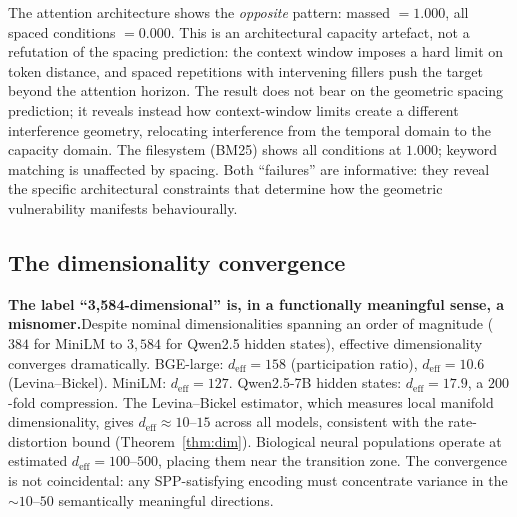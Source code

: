 \documentclass[11pt]{article}
\begin{document}
The attention architecture shows the \textit{opposite} pattern: massed $= 1.000$, all spaced conditions $= 0.000$. This is an architectural capacity artefact, not a refutation of the spacing prediction: the context window imposes a hard limit on token distance, and spaced repetitions with intervening fillers push the target beyond the attention horizon. The result does not bear on the geometric spacing prediction; it reveals instead how context-window limits create a different interference geometry, relocating interference from the temporal domain to the capacity domain. The filesystem (BM25) shows all conditions at $1.000$; keyword matching is unaffected by spacing. Both ``failures'' are informative: they reveal the specific architectural constraints that determine how the geometric vulnerability manifests behaviourally.

\subsection*{The dimensionality convergence}

\noindent\textbf{The label ``3{,}584-dimensional'' is, in a functionally meaningful sense, a misnomer.}\quad Despite nominal dimensionalities spanning an order of magnitude ($384$ for MiniLM to $3{,}584$ for Qwen2.5 hidden states), effective dimensionality converges dramatically. BGE-large: $d_\text{eff} = 158$ (participation ratio), $d_\text{eff} = 10.6$ (Levina--Bickel\cite{levina2005}). MiniLM: $d_\text{eff} = 127$. Qwen2.5-7B hidden states: $d_\text{eff} = 17.9$, a $200$-fold compression. The Levina--Bickel estimator, which measures local manifold dimensionality, gives $d_\text{eff} \approx 10$--$15$ across all models, consistent with the rate-distortion bound (Theorem~\ref{thm:dim}). Biological neural populations operate at estimated $d_\text{eff} = 100$--$500$\cite{stringer2019,gao2017}, placing them near the transition zone. The convergence is not coincidental: any SPP-satisfying encoding must concentrate variance in the ${\sim}10$--$50$ semantically meaningful directions.
\end{document}
